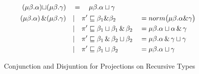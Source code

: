 \begin{figure}
\begin{align*}
(\mu\beta.\alpha) \sqcup& (\mu\beta.\gamma) &&= \quad \mu\beta.\alpha \sqcup \gamma &&\\
(\mu\beta.\alpha) \operatorname{\&}& (\mu\beta.\gamma) &&| \quad \pi' \sqsubseteq \beta_{1} \& \beta_{2} &&= norm \big(\mu\beta.\alpha \& \gamma \big) \\
\quad                   &   \               &&| \quad \pi' \sqsubseteq \beta_{1} \sqcup \beta_{1} \operatorname{\&} \beta_{2} &&= \mu\beta.\alpha \sqcup \alpha \operatorname{\&} \gamma \\
\quad                   &   \               &&| \quad \pi' \sqsubseteq \beta_{1} \operatorname{\&} \beta_{2} \sqcup \beta_{2} &&= \mu\beta.\alpha \operatorname{\&} \gamma \sqcup \gamma \\
\quad                   &   \               &&| \quad \pi' \sqsubseteq \beta_{1} \sqcup \beta_{2} &&= \mu\beta.\alpha \sqcup \gamma
\end{align*}
\caption[Conjunction and Disjunction for Projections 3]{Conjunction and Disjuntion for Projections on Recursive Types}
\label{fig:conjRec}
\end{figure}
